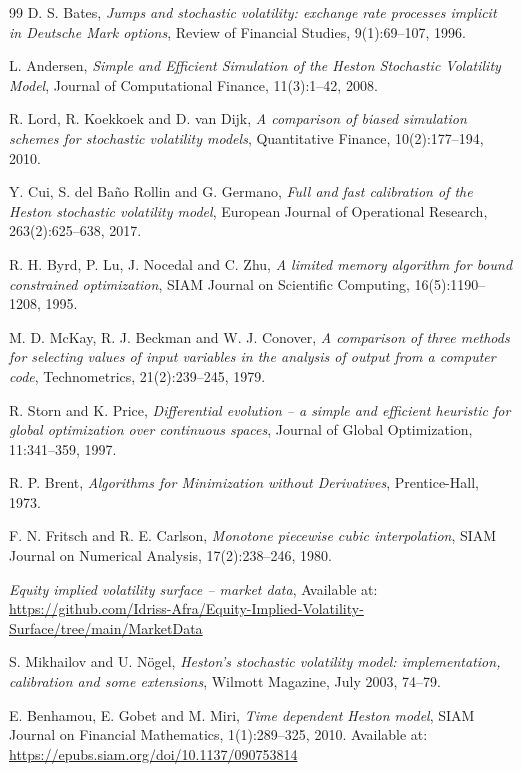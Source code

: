 \documentclass[11pt,a4paper]{article}
\theoremstyle{plain}
\theoremstyle{definition}
\begin{document}
\begin{thebibliography}{99}
D. S. Bates,
\textit{Jumps and stochastic volatility: exchange rate processes implicit in Deutsche Mark options},
Review of Financial Studies, 9(1):69--107, 1996.

L. Andersen,
\textit{Simple and Efficient Simulation of the Heston Stochastic Volatility Model},
Journal of Computational Finance, 11(3):1--42, 2008.

R. Lord, R. Koekkoek and D. van Dijk,
\textit{A comparison of biased simulation schemes for stochastic volatility models},
Quantitative Finance, 10(2):177--194, 2010.

Y. Cui, S. del Ba\~no Rollin and G. Germano,
\textit{Full and fast calibration of the Heston stochastic volatility model},
European Journal of Operational Research, 263(2):625--638, 2017.

R. H. Byrd, P. Lu, J. Nocedal and C. Zhu,
\textit{A limited memory algorithm for bound constrained optimization},
SIAM Journal on Scientific Computing, 16(5):1190--1208, 1995.

M. D. McKay, R. J. Beckman and W. J. Conover,
\textit{A comparison of three methods for selecting values of input variables in the analysis of output from a computer code},
Technometrics, 21(2):239--245, 1979.

R. Storn and K. Price,
\textit{Differential evolution -- a simple and efficient heuristic for global optimization over continuous spaces},
Journal of Global Optimization, 11:341--359, 1997.

R. P. Brent,
\textit{Algorithms for Minimization without Derivatives},
Prentice-Hall, 1973.

F. N. Fritsch and R. E. Carlson,
\textit{Monotone piecewise cubic interpolation},
SIAM Journal on Numerical Analysis, 17(2):238--246, 1980.

\textit{Equity implied volatility surface -- market data},
Available at: \url{https://github.com/Idriss-Afra/Equity-Implied-Volatility-Surface/tree/main/MarketData}

S. Mikhailov and U. N\"ogel,
\textit{Heston's stochastic volatility model: implementation, calibration and some extensions},
Wilmott Magazine, July 2003, 74--79.

E. Benhamou, E. Gobet and M. Miri,
\textit{Time dependent Heston model},
SIAM Journal on Financial Mathematics, 1(1):289--325, 2010.
Available at: \url{https://epubs.siam.org/doi/10.1137/090753814}

\end{thebibliography}
\end{document}
